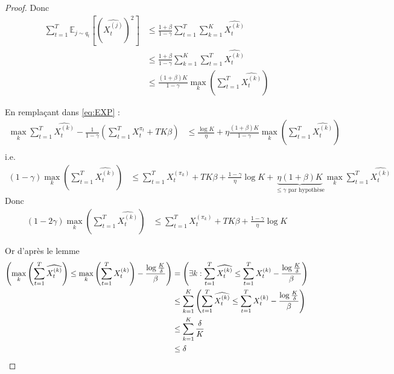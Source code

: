 \documentclass{article}
\let\P\relax
\DeclareMathOperator*{\P}{\mathbb{P}}
\theoremstyle{remark}
\theoremstyle{remark}
\begin{document}
\begin{proof}
   Donc
   \begin{align*}
     \sum_{t=1}^T \mathbb{E}_{j \sim q_t}\left[\left(\widehat{X_t^{(j)}}\right)^2\right] &\leq \frac{1 + \beta}{1 - \gamma} \sum_{t=1}^T \sum_{k=1}^K \widehat{X_t^{(k)}} \\
      &\leq \frac{1 + \beta}{1 - \gamma} \sum_{k=1}^K \sum_{t=1}^T \widehat{X_t^{(k)}} \\
      &\leq \frac{(1 + \beta) K}{1 - \gamma} \max_k \left( \sum_{t=1}^T \widehat{X_t^{(k)}} \right)
   \end{align*}

   En remplaçant dans \eqref{eq:EXP} :
   \begin{align*}
      \max_k \sum_{t=1}^T \widehat{X_t^{(k)}} - \frac{1}{1-\gamma} \left( \sum_{t=1}^T X_t^{\pi_t} + T K \beta \right) &\leq \frac{\log K}{\eta} + \eta \frac{(1 + \beta) K}{1 - \gamma} \max_k \left( \sum_{t=1}^T \widehat{X_t^{(k)}} \right) \\
   \end{align*}
   i.e.
   \begin{align*}
      (1-\gamma) \max_k \left( \sum_{t=1}^T \widehat{X_t^{(k)}} \right) &\leq \sum_{t=1}^T X_t^{(\pi_k)} + T K \beta + \frac{1-\gamma}{\eta} \log K + \underbrace{\eta (1+\beta) K }_{\leq \gamma \text{ par hypothèse}} \max_k \sum_{t=1}^T \widehat{X_t^{(k)}}
   \end{align*}
   Donc
   \begin{align*}
      (1-2\gamma) \max_k \left( \sum_{t=1}^T \widehat{X_t^{(k)}} \right) &\leq \sum_{t=1}^T X_t^{(\pi_k)} + T K \beta + \frac{1-\gamma}{\eta} \log K
   \end{align*}

   Or d'après le lemme
   \begin{align*}
      \P\left( \max_k \left( \sum_{t=1}^T \widehat{X_t^{(k)}} \right) \leq \max_k \left( \sum_{t=1}^T X_t^{(k)} \right) - \frac{\log \frac K \delta}{\beta} \right) &= \P\left( \exists k :  \sum_{t=1}^T \widehat{X_t^{(k)}} \leq  \sum_{t=1}^T X_t^{(k)} - \frac{\log \frac K \delta}{\beta} \right) \\
      &\leq \sum_{k=1}^K \P\left( \sum_{t=1}^T \widehat{X_t^{(k)}} \leq  \sum_{t=1}^T X_t^{(k)} - \frac{\log \frac K \delta}{\beta} \right) \\
      &\leq \sum_{k=1}^K \frac \delta K \\
      &\leq \delta
   \end{align*}


\end{proof}
\end{document}
